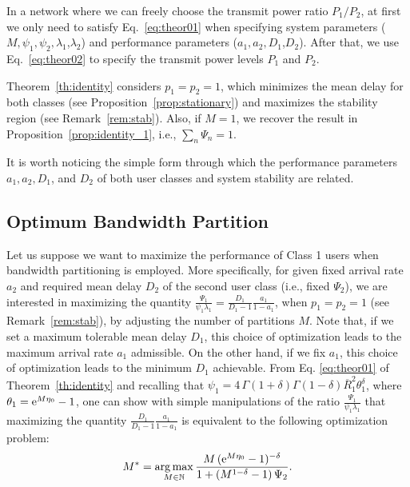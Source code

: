 \begin{remark} \label{rmk:FreePowers}
In a network where we can freely choose the transmit power ratio $P_1/P_2$, at first we only need to satisfy Eq.~\eqref{eq:theor01} when specifying system parameters ($M,\psi_1,\psi_2,\lambda_1$,$\lambda_2$) and performance parameters ($a_1,a_2,D_1$,$D_2$). After that, we use Eq.~\eqref{eq:theor02} to specify the transmit power levels $P_1$ and $P_2$.
\end{remark}

Theorem~\ref{th:identity} considers $p_1=p_2=1$, which minimizes the mean delay for both classes (see Proposition~\ref{prop:stationary}) and maximizes the stability region (see Remark~\ref{rem:stab}). Also, if $M=1$, we recover the result in Proposition~\ref{prop:identity_1}, i.e., $\sum_n \Psi_n = 1$.

It is worth noticing the simple form through which the performance parameters $a_1,a_2,D_1$, and $D_2$ of both user classes and system stability are related.

\subsection{Optimum Bandwidth Partition}
\label{sec:opt}
Let us suppose we want to maximize the performance of Class 1 users when bandwidth partitioning is employed. More specifically, for given fixed arrival rate $a_2$ and required mean delay $D_2$ of the second user class (i.e., fixed $\Psi_2$), we are interested in maximizing the quantity $\frac{\Psi_1}{\psi_1\lambda_1}=\frac{D_1}{D_1-1}\frac{a_1}{1-a_1}$, when $p_1=p_2=1$ (see Remark~\ref{rem:stab}), by adjusting the number of partitions $M$. Note that, if we set a maximum tolerable mean delay $D_1$, this choice of optimization leads to the maximum arrival rate $a_1$ admissible. On the other hand, if we fix $a_1$, this choice of optimization leads to the minimum $D_1$ achievable. From Eq. \eqref{eq:theor01} of Theorem~\ref{th:identity} and recalling that $\psi_1 = 4\,\Gamma(1+\delta) \Gamma(1-\delta) \overline{R}_1^2 \theta_1^\delta$, where $\theta_1 = \mathrm{e}^{M\eta_0} - 1$, one can show with simple manipulations of the ratio $\frac{\Psi_1}{\psi_1\lambda_1}$ that maximizing the quantity $\frac{D_1}{D_1-1}\frac{a_1}{1-a_1}$ is equivalent to the following optimization problem:
%
\begin{equation} \label{eq:opt_M}
	M^* = \operatorname*{arg\,max}_{M\in{\mathbb N}} \dfrac{M\,(\mathrm{e}^{M\eta_0}-1)^{-\delta}}
    	{1+(M^{1-\delta}-1)\,\Psi_2}.
\end{equation}

